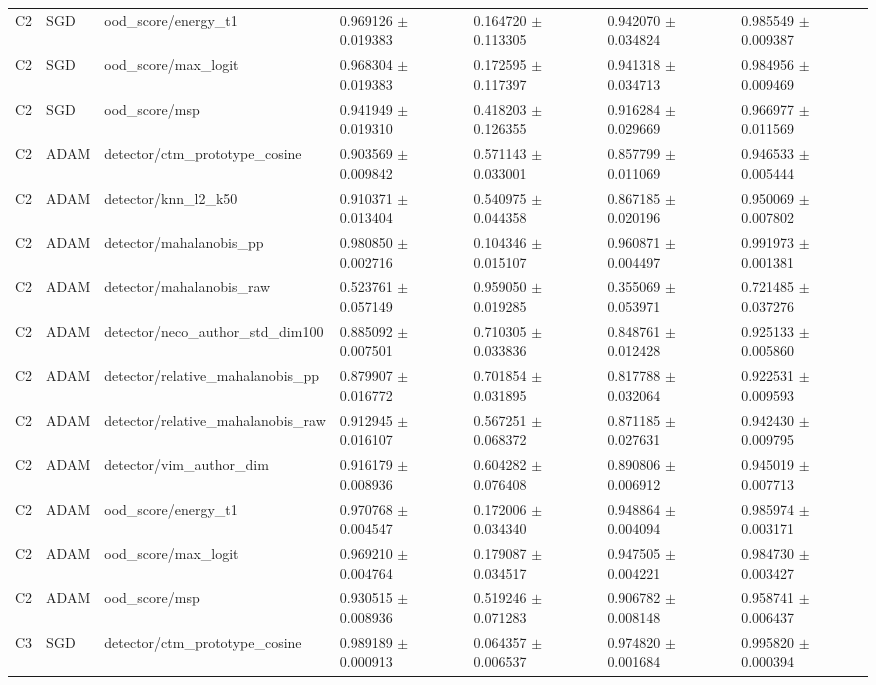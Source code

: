 \begin{longtable}{lllllll}
C2 & SGD & ood\_score/energy\_t1 & 0.969126 $\pm$ 0.019383 & 0.164720 $\pm$ 0.113305 & 0.942070 $\pm$ 0.034824 & 0.985549 $\pm$ 0.009387 \\
C2 & SGD & ood\_score/max\_logit & 0.968304 $\pm$ 0.019383 & 0.172595 $\pm$ 0.117397 & 0.941318 $\pm$ 0.034713 & 0.984956 $\pm$ 0.009469 \\
C2 & SGD & ood\_score/msp & 0.941949 $\pm$ 0.019310 & 0.418203 $\pm$ 0.126355 & 0.916284 $\pm$ 0.029669 & 0.966977 $\pm$ 0.011569 \\
C2 & ADAM & detector/ctm\_prototype\_cosine & 0.903569 $\pm$ 0.009842 & 0.571143 $\pm$ 0.033001 & 0.857799 $\pm$ 0.011069 & 0.946533 $\pm$ 0.005444 \\
C2 & ADAM & detector/knn\_l2\_k50 & 0.910371 $\pm$ 0.013404 & 0.540975 $\pm$ 0.044358 & 0.867185 $\pm$ 0.020196 & 0.950069 $\pm$ 0.007802 \\
C2 & ADAM & detector/mahalanobis\_pp & 0.980850 $\pm$ 0.002716 & 0.104346 $\pm$ 0.015107 & 0.960871 $\pm$ 0.004497 & 0.991973 $\pm$ 0.001381 \\
C2 & ADAM & detector/mahalanobis\_raw & 0.523761 $\pm$ 0.057149 & 0.959050 $\pm$ 0.019285 & 0.355069 $\pm$ 0.053971 & 0.721485 $\pm$ 0.037276 \\
C2 & ADAM & detector/neco\_author\_std\_dim100 & 0.885092 $\pm$ 0.007501 & 0.710305 $\pm$ 0.033836 & 0.848761 $\pm$ 0.012428 & 0.925133 $\pm$ 0.005860 \\
C2 & ADAM & detector/relative\_mahalanobis\_pp & 0.879907 $\pm$ 0.016772 & 0.701854 $\pm$ 0.031895 & 0.817788 $\pm$ 0.032064 & 0.922531 $\pm$ 0.009593 \\
C2 & ADAM & detector/relative\_mahalanobis\_raw & 0.912945 $\pm$ 0.016107 & 0.567251 $\pm$ 0.068372 & 0.871185 $\pm$ 0.027631 & 0.942430 $\pm$ 0.009795 \\
C2 & ADAM & detector/vim\_author\_dim & 0.916179 $\pm$ 0.008936 & 0.604282 $\pm$ 0.076408 & 0.890806 $\pm$ 0.006912 & 0.945019 $\pm$ 0.007713 \\
C2 & ADAM & ood\_score/energy\_t1 & 0.970768 $\pm$ 0.004547 & 0.172006 $\pm$ 0.034340 & 0.948864 $\pm$ 0.004094 & 0.985974 $\pm$ 0.003171 \\
C2 & ADAM & ood\_score/max\_logit & 0.969210 $\pm$ 0.004764 & 0.179087 $\pm$ 0.034517 & 0.947505 $\pm$ 0.004221 & 0.984730 $\pm$ 0.003427 \\
C2 & ADAM & ood\_score/msp & 0.930515 $\pm$ 0.008936 & 0.519246 $\pm$ 0.071283 & 0.906782 $\pm$ 0.008148 & 0.958741 $\pm$ 0.006437 \\
C3 & SGD & detector/ctm\_prototype\_cosine & 0.989189 $\pm$ 0.000913 & 0.064357 $\pm$ 0.006537 & 0.974820 $\pm$ 0.001684 & 0.995820 $\pm$ 0.000394 \\

\end{longtable}
